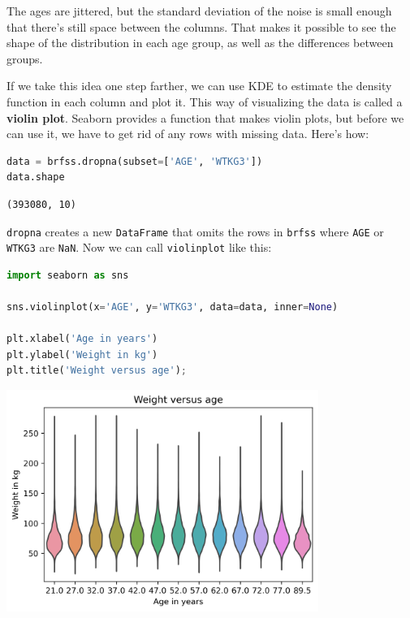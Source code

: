 The ages are jittered, but the standard deviation of the noise is small
enough that there's still space between the columns. That makes it
possible to see the shape of the distribution in each age group, as well
as the differences between groups.

If we take this idea one step farther, we can use KDE to estimate the
density function in each column and plot it. This way of visualizing the
data is called a \textbf{violin plot}. Seaborn provides a function that
makes violin plots, but before we can use it, we have to get rid of any
rows with missing data. Here's how:

\begin{lstlisting}[language=Python,style=source]
data = brfss.dropna(subset=['AGE', 'WTKG3'])
data.shape
\end{lstlisting}

\begin{lstlisting}[style=output]
(393080, 10)
\end{lstlisting}

\passthrough{\lstinline!dropna!} creates a new
\passthrough{\lstinline!DataFrame!} that omits the rows in
\passthrough{\lstinline!brfss!} where \passthrough{\lstinline!AGE!} or
\passthrough{\lstinline!WTKG3!} are \passthrough{\lstinline!NaN!}. Now
we can call \passthrough{\lstinline!violinplot!} like this:

\begin{lstlisting}[language=Python,style=source]
import seaborn as sns

sns.violinplot(x='AGE', y='WTKG3', data=data, inner=None)

plt.xlabel('Age in years')
plt.ylabel('Weight in kg')
plt.title('Weight versus age');
\end{lstlisting}

\begin{center}
\includegraphics[width=4in]{chapters/09_relationships_files/09_relationships_43_0.png}
\end{center}

